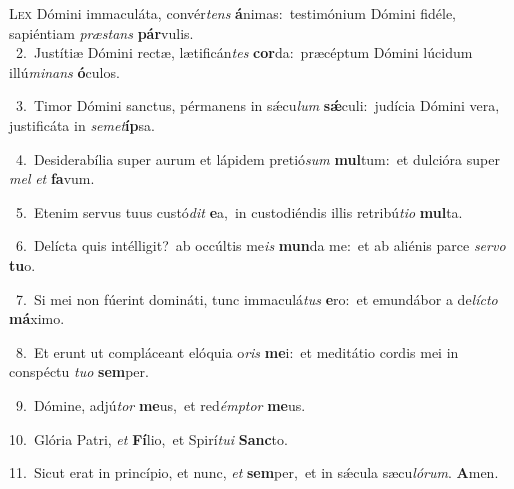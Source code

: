 \lettrine{\initial\textcolor{\initialcolor}{L}}{ex} Dómini immaculáta, convér\textit{tens} \textbf{á}\-nimas:~\star testimónium Dómini fidéle, sapiéntiam \textit{præ}\-\textit{stans} \textbf{pár}\-vulis.\\
{\numbfont\textcolor{\numbcolor}{~2.}}~Justítiæ Dómini rectæ, lætificán\textit{tes} \textbf{cor}\-da:~\star præcéptum Dómini lúcidum illú\-\textit{mi}\-\textit{nans} \textbf{ó}\-culos.\par
{\numbfont\textcolor{\numbcolor}{~3.}}~Timor Dómini sanctus, pérmanens in sǽcu\textit{lum} \textbf{sǽ}\-culi:~\star judícia Dómini vera, justificáta in \textit{se}\-\textit{met}\textbf{íp}sa.\par
{\numbfont\textcolor{\numbcolor}{~4.}}~Desiderabília super aurum et lápidem pretió\textit{sum} \textbf{mul}\-tum:~\star et dulcióra super \textit{mel} \textit{et} \textbf{fa}\-vum.\par
{\numbfont\textcolor{\numbcolor}{~5.}}~Etenim servus tuus custó\textit{dit} \textbf{e}\-a,~\star in custodiéndis illis retribú\-\textit{ti}\-\textit{o} \textbf{mul}\-ta.\par
{\numbfont\textcolor{\numbcolor}{~6.}}~Delícta quis intélligit?~\dagger ab occúltis me\textit{is} \textbf{mun}\-da me:~\star et ab aliénis parce \textit{ser}\-\textit{vo} \textbf{tu}\-o.\par
{\numbfont\textcolor{\numbcolor}{~7.}}~Si mei non fúerint domináti, tunc immaculá\textit{tus} \textbf{e}\-ro:~\star et emundábor a de\-\textit{líc}\-\textit{to} \textbf{má}\-ximo.\par
{\numbfont\textcolor{\numbcolor}{~8.}}~Et erunt ut compláceant elóquia o\textit{ris} \textbf{me}\-i:~\star et meditátio cordis mei in conspéctu \textit{tu}\-\textit{o} \textbf{sem}\-per.\par
{\numbfont\textcolor{\numbcolor}{~9.}}~Dómine, adjú\textit{tor} \textbf{me}\-us,~\star et red\-\textit{émp}\-\textit{tor} \textbf{me}\-us.\par
{\numbfont\textcolor{\numbcolor}{10.}}~Glória Patri, \textit{et} \textbf{Fí}\-lio,~\star et Spirí\-\textit{tu}\-\textit{i} \textbf{Sanc}\-to.\par
{\numbfont\textcolor{\numbcolor}{11.}}~Sicut erat in princípio, et nunc, \textit{et} \textbf{sem}\-per,~\star et in sǽcula sæcu\-\textit{ló}\-\textit{rum}. \textbf{A}\-men.\par
